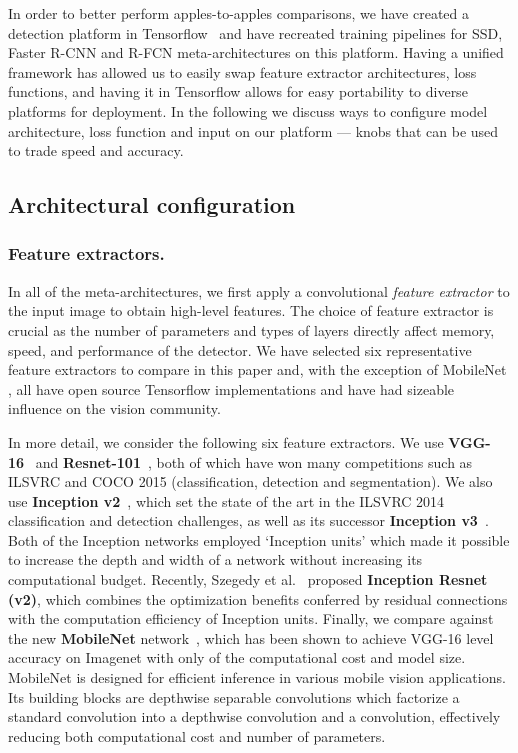 \documentclass[10pt,twocolumn,letterpaper]{article}
\renewcommand{\paragraph}[1]{\subsubsection{#1}}
\begin{document}
In order to better perform apples-to-apples comparisons, we have created a   detection platform in Tensorflow~\cite{abadi2015tensorflow} and have recreated training pipelines for SSD, Faster R-CNN and R-FCN meta-architectures on this platform.  Having a unified framework has allowed us to easily swap feature extractor architectures, loss functions, 
and having it in Tensorflow allows for easy portability to diverse platforms for deployment.  In the following we discuss ways to configure model architecture, loss function and input on our platform --- knobs that can be used to trade speed and accuracy.

\subsection{Architectural configuration}

\paragraph{Feature extractors.}
In all of the meta-architectures, we first apply a convolutional \emph{feature extractor} to the input image to obtain high-level features.  The choice of feature extractor is crucial as the number of parameters and types of layers directly affect memory, speed, and performance of the detector.
We have selected six representative feature extractors to compare in this paper
and, with the exception of MobileNet \cite{howard17}, all have open source  Tensorflow implementations and have had sizeable influence on the vision community. 


In more detail, we consider the following six feature extractors.
We use
{\bf VGG-16}~\cite{simonyan2014very}
and {\bf  Resnet-101}~\cite{he2015deep}, both of
which have won many competitions such as ILSVRC and COCO 2015
(classification, detection and segmentation).
We also use  {\bf Inception v2}~\cite{ioffe2015batch},
which set the state of the art in the ILSVRC 2014 classification and
detection challenges,
as well as its successor {\bf Inception  v3}~\cite{szegedy2015rethinking}.
Both of the Inception networks
employed `Inception units' which made it possible to increase the
depth and width of a network without increasing its computational
budget.  Recently, Szegedy et al.~\cite{szegedy2016inception} proposed
{\bf Inception Resnet (v2)}, which combines the optimization benefits
conferred by residual connections with the computation efficiency of
Inception units.  Finally, we compare against the new {\bf MobileNet}
network~\cite{howard17}, which has been shown to achieve VGG-16 level
accuracy on Imagenet with only  of the computational cost
and model size. MobileNet is designed for efficient inference in
various mobile vision applications. Its building blocks are depthwise
separable convolutions which factorize a standard convolution into a
depthwise convolution and a  convolution,  
effectively reducing both computational cost and number of
parameters. 
\end{document}
